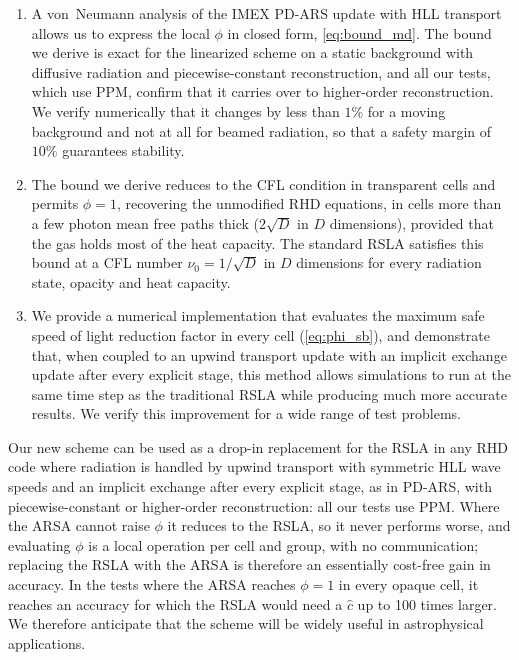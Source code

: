 \documentclass[preprint,12pt,authoryear]{elsarticle}
\begin{document}
\begin{enumerate}
    \item A von~Neumann analysis of the IMEX PD-ARS update with HLL transport allows us to express the local $\phi$ in closed form, \autoref{eq:bound_md}. The bound we derive is exact for the linearized scheme on a static background with diffusive radiation and piecewise-constant reconstruction, and all our tests, which use PPM, confirm that it carries over to higher-order reconstruction. We verify numerically that it changes by less than $1\%$ for a moving background and not at all for beamed radiation, so that a safety margin of $10\%$ guarantees stability.
    \item The bound we derive reduces to the CFL condition in transparent cells and permits $\phi = 1$, recovering the unmodified RHD equations, in cells more than a few photon mean free paths thick ($2\sqrt{D}$ in $D$ dimensions), provided that the gas holds most of the heat capacity. The standard RSLA satisfies this bound at a CFL number $\nu_0 = 1/\sqrt{D}$ in $D$ dimensions for every radiation state, opacity and heat capacity.
    \item We provide a numerical implementation that evaluates the maximum safe speed of light reduction factor in every cell (\autoref{eq:phi_sb}), and demonstrate that, when coupled to an upwind transport update with an implicit exchange update after every explicit stage, this method allows simulations to run at the same time step as the traditional RSLA while producing much more accurate results. We verify this improvement for a wide range of test problems.
\end{enumerate}

Our new scheme can be used as a drop-in replacement for the RSLA in any RHD code where radiation is handled by upwind transport with symmetric HLL wave speeds and an implicit exchange after every explicit stage, as in PD-ARS, with piecewise-constant or higher-order reconstruction: all our tests use PPM. 
Where the ARSA cannot raise $\phi$ it reduces to the RSLA, so it never performs worse, and evaluating $\phi$ is a local operation per cell and group, with no communication; replacing the RSLA with the ARSA is therefore an essentially cost-free gain in accuracy. In the tests where the ARSA reaches $\phi = 1$ in every opaque cell, it reaches an accuracy for which the RSLA would need a $\hat{c}$ up to 100 times larger. We therefore anticipate that the scheme will be widely useful in astrophysical applications.
\end{document}
